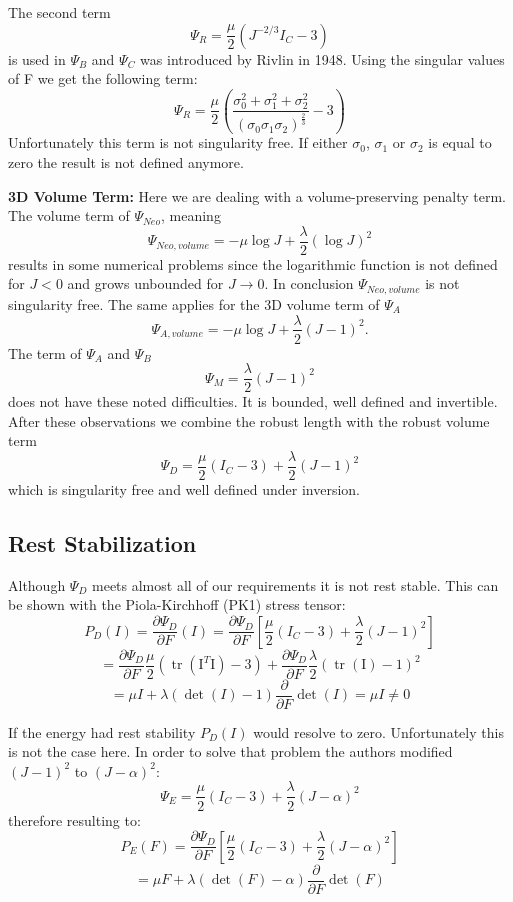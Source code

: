 The second term 
\[
\Psi_{R} = \frac{\mu}{2}\left(J^{-2 / 3} I_{C}-3\right)
\]
is used in $\Psi_{B}$ and $\Psi_{C}$ was introduced by Rivlin in 1948. Using the singular values of F we get the following term:
\[
\Psi_{R} = \frac{\mu}{2}\left(\frac{\sigma_{0}^2 + \sigma_{1}^2 + \sigma_{2}^2}{(\sigma_{0}  \sigma_{1}  \sigma_{2})^\frac{2}{3}}
 - 3\right)
\]
Unfortunately this term is not singularity free. If either $\sigma_{0}$, $\sigma_{1}$ or $\sigma_{2}$ is equal to zero the result is not defined anymore.


\textbf{3D Volume Term:} Here we are dealing with a volume-preserving penalty term. The volume term of $\Psi_{Neo}$, meaning
\[
\Psi_{Neo, volume} = -\mu \log J+\frac{\lambda}{2}(\log J)^{2}
\]
results in some numerical problems since the logarithmic function is not defined for $J<0$ and grows unbounded for $J \rightarrow 0$. In conclusion $\Psi_{Neo, volume}$ is not singularity free. 
The same applies for the 3D volume term of $\Psi_{A}$
\[
\Psi_{A, volume} = -\mu \log J+\frac{\lambda}{2}(J-1)^{2}.
\]
The term of $\Psi_{A}$ and $\Psi_{B}$
\[
\Psi_{M} = \frac{\lambda}{2}(J-1)^{2}
\]
does not have these noted difficulties. It is bounded, well defined and invertible. After these observations we combine the robust length with the robust volume term
\[
\Psi_{D} = \frac{\mu}{2}\left(I_{C}-3\right) +\frac{\lambda}{2}(J-1)^{2}
\]
which is singularity free and well defined under inversion.


\subsection{Rest Stabilization}
Although $\Psi_{D}$ meets almost all of our requirements it is not rest stable. This can be shown with the Piola-Kirchhoff (PK1) stress tensor:
\[
P_{D}(I) = \frac{\partial \Psi_{D}}{\partial F} (I) = \frac{\partial \Psi_{D}}{\partial F} \left[ \frac{\mu}{2}\left(I_{C}-3\right) +\frac{\lambda}{2}(J-1)^{2} \right]
\]
\[
= \frac{\partial \Psi_{D}}{\partial F}  \frac{\mu}{2}\left(\operatorname{tr}(\mathrm{I}^{T} \mathrm{I})-3\right) +\frac{\partial \Psi_{D}}{\partial F} \frac{\lambda}{2}(\operatorname{tr}(\mathrm{I})-1)^{2}
\]
\[
= \mu I + \lambda (\operatorname{det}(I)-1)  \frac{\partial}{\partial F} \operatorname{det}(I) = \mu I \neq 0
\]

If the energy had rest stability $P_{D}(I)$ would resolve to zero. Unfortunately this is not the case here. In order to solve that problem the authors modified $(J-1)^{2}$ to $(J-\alpha)^{2}$:
\[
\Psi_{E} = \frac{\mu}{2}\left(I_{C}-3\right) +\frac{\lambda}{2}(J-\alpha)^{2}
\]
therefore resulting to:
\[
P_{E}(F) = \frac{\partial \Psi_{D}}{\partial F} \left[ \frac{\mu}{2}\left(I_{C}-3\right) +\frac{\lambda}{2}(J-\alpha)^{2} \right]
\]
\begin{equation}\label{eq:pk1_unstable}
= \mu F + \lambda (\operatorname{det}(F)-\alpha)  \frac{\partial}{\partial F} \operatorname{det}(F)
\end{equation}

